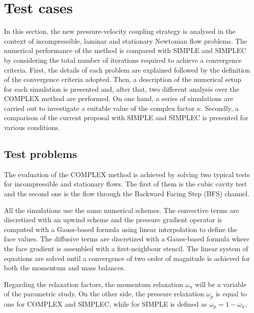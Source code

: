 \documentclass[final,3p,times,11pt,onecolumn]{myElsarticle}
\numberwithin{equation}{section}
\begin{document}
\section{Test cases}
\label{sec:cases}

In this section, the new pressure-velocity coupling strategy is analysed in the context of incompressible, laminar and stationary Newtonian flow problems. The numerical performance of the method is compared with SIMPLE and SIMPLEC by considering the total number of iterations required to achieve a convergence criteria. First, the details of each problem are explained followed by the definition of the convergence criteria adopted. Then, a description of the numerical setup for each simulation is presented and, after that, two different analysis over the COMPLEX method are performed. On one hand, a series of simulations are carried out to investigate a suitable value of the complex factor $\kappa$. Secondly, a comparison of the current proposal with SIMPLE and SIMPLEC is presented for various conditions. 

\subsection{Test problems}\label{Section:problemDescription}
 The evaluation of the COMPLEX method is achieved by solving two typical tests for incompressible and stationary flows. The first of them is the cubic cavity test and the second one is the flow through the Backward Facing Step (BFS) channel.

All the simulations use the same numerical schemes. The convective terms are discretized with an upwind scheme and the pressure gradient operator is computed with a Gauss-based formula using linear interpolation to define the face values. The diffusive terms are discretized with a Gauss-based formula where the face gradient is assembled with a first-neighbour stencil. The linear system of equations are solved until a convergence of two order of magnitude is achieved for both the momentum and mass balances. 

Regarding the relaxation factors, the momentum relaxation $\omega_u$ will be a variable of the parametric study. On the other side, the pressure relaxation $\omega_p$ is equal to one for COMPLEX and SIMPLEC, while for SIMPLE is defined as $
\omega_p = 1 - \omega_u$.
\end{document}

